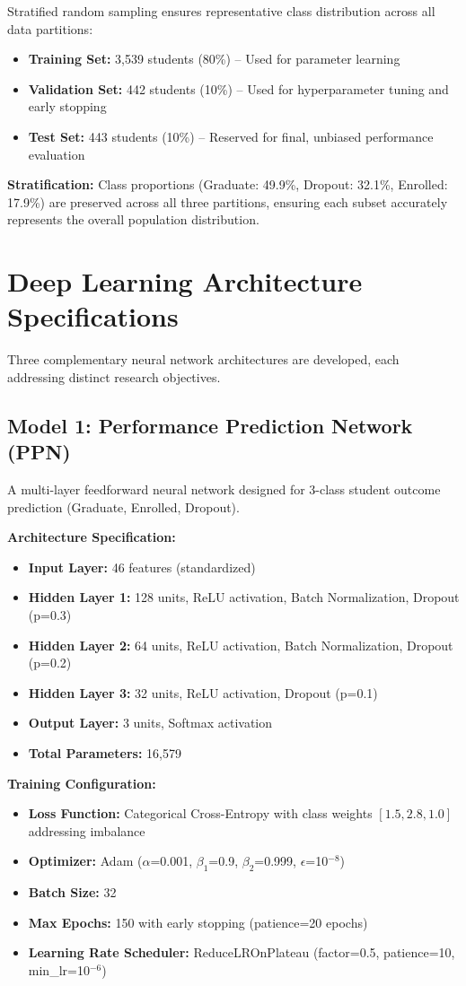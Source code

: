 Stratified random sampling ensures representative class distribution across all data partitions:

\begin{itemize}
\item \textbf{Training Set:} 3,539 students (80\%) -- Used for parameter learning
\item \textbf{Validation Set:} 442 students (10\%) -- Used for hyperparameter tuning and early stopping
\item \textbf{Test Set:} 443 students (10\%) -- Reserved for final, unbiased performance evaluation
\end{itemize}

\textbf{Stratification:} Class proportions (Graduate: 49.9\%, Dropout: 32.1\%, Enrolled: 17.9\%) are preserved across all three partitions, ensuring each subset accurately represents the overall population distribution.
\section{Deep Learning Architecture Specifications}

Three complementary neural network architectures are developed, each addressing distinct research objectives.

\subsection{Model 1: Performance Prediction Network (PPN)}

A multi-layer feedforward neural network designed for 3-class student outcome prediction (Graduate, Enrolled, Dropout).

\textbf{Architecture Specification:}
\begin{itemize}
\item \textbf{Input Layer:} 46 features (standardized)
\item \textbf{Hidden Layer 1:} 128 units, ReLU activation, Batch Normalization, Dropout (p=0.3)
\item \textbf{Hidden Layer 2:} 64 units, ReLU activation, Batch Normalization, Dropout (p=0.2)
\item \textbf{Hidden Layer 3:} 32 units, ReLU activation, Dropout (p=0.1)
\item \textbf{Output Layer:} 3 units, Softmax activation
\item \textbf{Total Parameters:} 16,579
\end{itemize}

\textbf{Training Configuration:}
\begin{itemize}
\item \textbf{Loss Function:} Categorical Cross-Entropy with class weights $[1.5, 2.8, 1.0]$ addressing imbalance
\item \textbf{Optimizer:} Adam ($\alpha$=0.001, $\beta_1$=0.9, $\beta_2$=0.999, $\epsilon$=10$^{-8}$)
\item \textbf{Batch Size:} 32
\item \textbf{Max Epochs:} 150 with early stopping (patience=20 epochs)
\item \textbf{Learning Rate Scheduler:} ReduceLROnPlateau (factor=0.5, patience=10, min\_lr=10$^{-6}$)
\end{itemize}

